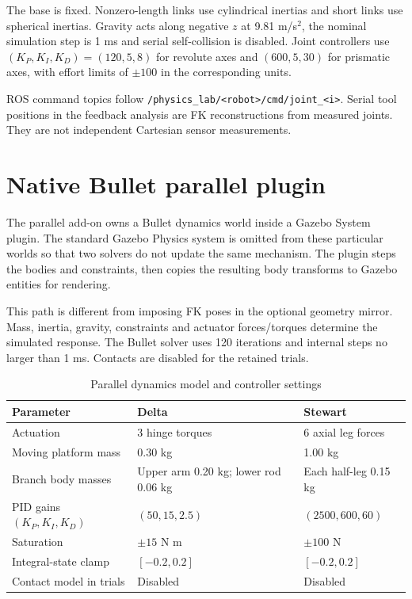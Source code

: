 \documentclass[11pt,a4paper,oneside]{report}
\begin{document}
The base is fixed. Nonzero-length links use cylindrical inertias and short links use spherical inertias. Gravity acts along negative $z$ at 9.81 m/s$^2$, the nominal simulation step is 1 ms and serial self-collision is disabled. Joint controllers use $(K_P,K_I,K_D)=(120,5,8)$ for revolute axes and $(600,5,30)$ for prismatic axes, with effort limits of $\pm100$ in the corresponding units.

ROS command topics follow \texttt{/physics\_lab/<robot>/cmd/joint\_<i>}. Serial tool positions in the feedback analysis are FK reconstructions from measured joints. They are not independent Cartesian sensor measurements.

\section{Native Bullet parallel plugin}
The parallel add-on owns a Bullet dynamics world inside a Gazebo System plugin. The standard Gazebo Physics system is omitted from these particular worlds so that two solvers do not update the same mechanism. The plugin steps the bodies and constraints, then copies the resulting body transforms to Gazebo entities for rendering.

This path is different from imposing FK poses in the optional geometry mirror. Mass, inertia, gravity, constraints and actuator forces/torques determine the simulated response. The Bullet solver uses 120 iterations and internal steps no larger than 1 ms. Contacts are disabled for the retained trials.

\begin{table}[H]\centering\small
\caption{Parallel dynamics model and controller settings}
\begin{tabularx}{\textwidth}{p{4.1cm}XX}\toprule
Parameter&Delta&Stewart\\\midrule
Actuation&3 hinge torques&6 axial leg forces\\
Moving platform mass&0.30 kg&1.00 kg\\
Branch body masses&Upper arm 0.20 kg; lower rod 0.06 kg&Each half-leg 0.15 kg\\
PID gains $(K_P,K_I,K_D)$&$(50,15,2.5)$&$(2500,600,60)$\\
Saturation&$\pm15$ N m&$\pm100$ N\\
Integral-state clamp&$[-0.2,0.2]$&$[-0.2,0.2]$\\
Contact model in trials&Disabled&Disabled\\\bottomrule
\end{tabularx}
\end{table}
\end{document}
